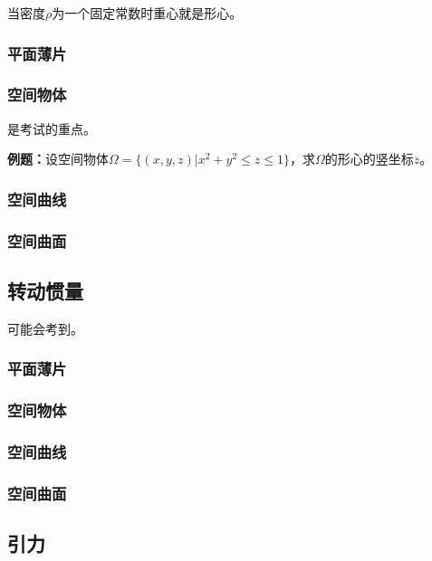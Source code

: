 \documentclass[UTF8, 12pt]{ctexart}
\begin{document}
        当密度$\rho$为一个固定常数时重心就是形心。

        \subsubsection{平面薄片}

        \subsubsection{空间物体}

        是考试的重点。

        \textbf{例题：}设空间物体$\Omega=\{(x,y,z)|x^2+y^2\leqslant z\leqslant1\}$，求$\Omega$的形心的竖坐标$\overline{z}$。


        \subsubsection{空间曲线}

        \subsubsection{空间曲面}

        \subsection{转动惯量}

        可能会考到。

        \subsubsection{平面薄片}

        \subsubsection{空间物体}

        \subsubsection{空间曲线}

        \subsubsection{空间曲面}

        \subsection{引力}
\end{document}
